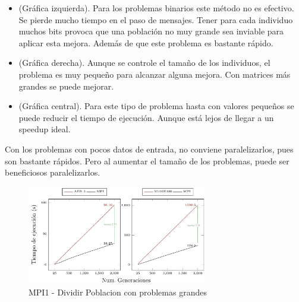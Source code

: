 		\begin{itemize}
			\item (Gráfica izquierda). Para los problemas binarios este método no es efectivo. Se pierde mucho tiempo en el paso de mensajes. Tener para cada individuo muchos bits provoca que una población no muy grande sea inviable para aplicar esta mejora. Además de que este problema es bastante rápido.
			\item (Gráfica derecha). Aunque se controle el tamaño de los individuos, el problema es muy pequeño para alcanzar alguna mejora. Con matrices más grandes se puede mejorar.
			\item (Gráfica central). Para este tipo de problema hasta con valores pequeños se puede reducir el tiempo de ejecución. Aunque está lejos de llegar a un speedup ideal.
		\end{itemize}

		Con los problemas con pocos datos de entrada, no conviene paralelizarlos, pues son bastante rápidos. Pero al aumentar el tamaño de los problemas, puede ser beneficiosos paralelizarlos.
		
		\newpage

		\begin{figure}[!h]
			\centering
			\includegraphics[width=0.7\textwidth]{images/chapter_4/pev_mpi1}
			\caption{MPI1 - Dividir Poblacion con problemas grandes}
			\label{fig:MPI1.2 - Dividir Poblacion + Speedup}
		\end{figure}

